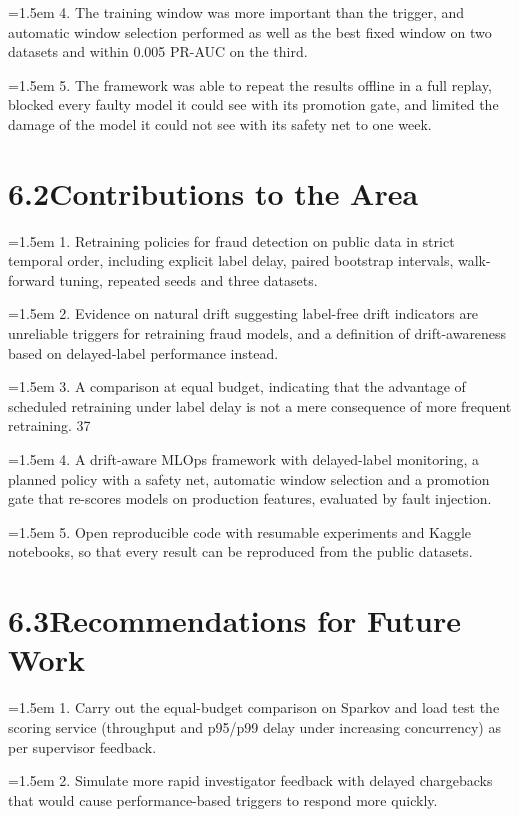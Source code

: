 \documentclass[11pt,letterpaper]{report}
\newcommand{\listitem}[1]{\par\hangindent=1.5em\hangafter=1 #1\par}
\begin{document}
\listitem{4. The training window was more important than the trigger, and automatic window selection performed as well as the best fixed window on two datasets and within 0.005 PR-AUC on the third.}

\listitem{5. The framework was able to repeat the results offline in a full replay, blocked every faulty model it could see with its promotion gate, and limited the damage of the model it could not see with its safety net to one week.}

\section*{6.2\quad Contributions to the Area}

\listitem{1. Retraining policies for fraud detection on public data in strict temporal order, including explicit label delay, paired bootstrap intervals, walk-forward tuning, repeated seeds and three datasets.}

\listitem{2. Evidence on natural drift suggesting label-free drift indicators are unreliable triggers for retraining fraud models, and a definition of drift-awareness based on delayed-label performance instead.}

\listitem{3. A comparison at equal budget, indicating that the advantage of scheduled retraining under label delay is not a mere consequence of more frequent retraining. 37}

\listitem{4. A drift-aware MLOps framework with delayed-label monitoring, a planned policy with a safety net, automatic window selection and a promotion gate that re-scores models on production features, evaluated by fault injection.}

\listitem{5. Open reproducible code with resumable experiments and Kaggle notebooks, so that every result can be reproduced from the public datasets.}

\section*{6.3\quad Recommendations for Future Work}

\listitem{1. Carry out the equal-budget comparison on Sparkov and load test the scoring service (throughput and p95/p99 delay under increasing concurrency) as per supervisor feedback.}

\listitem{2. Simulate more rapid investigator feedback with delayed chargebacks that would cause performance-based triggers to respond more quickly.}
\end{document}
